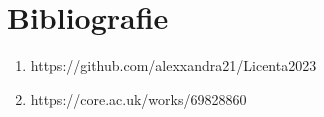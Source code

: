 \chapter*{Bibliografie} 

\begin{enumerate}
	\item https://github.com/alexxandra21/Licenta2023
	\item https://core.ac.uk/works/69828860
\end{enumerate}